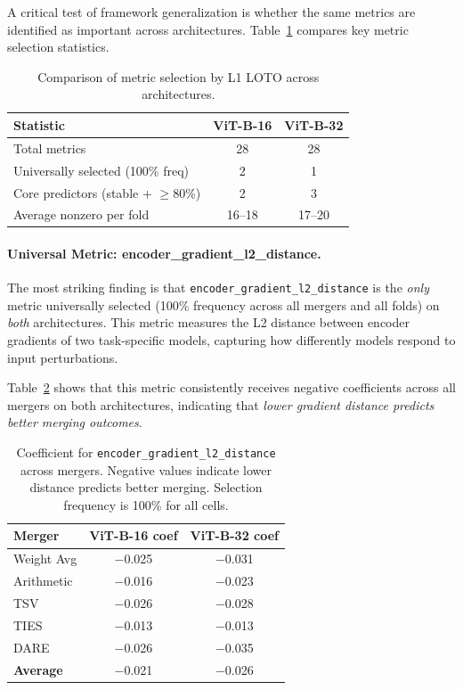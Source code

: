 A critical test of framework generalization is whether the same metrics are identified as important across architectures. Table~\ref{tab:metric_comparison} compares key metric selection statistics.

\begin{table}[h]
\centering
\caption{Comparison of metric selection by L1 LOTO across architectures.}
\label{tab:metric_comparison}
\begin{tabular}{l|cc}
\toprule
\textbf{Statistic} & \textbf{ViT-B-16} & \textbf{ViT-B-32} \\
\midrule
Total metrics & 28 & 28 \\
Universally selected (100\% freq) & 2 & 1 \\
Core predictors (stable + $\geq$80\%) & 2 & 3 \\
Average nonzero per fold & 16--18 & 17--20 \\
\bottomrule
\end{tabular}
\end{table}

\paragraph{Universal Metric: encoder\_gradient\_l2\_distance.}
The most striking finding is that \texttt{encoder\_gradient\_l2\_distance} is the \emph{only} metric universally selected (100\% frequency across all mergers and all folds) on \emph{both} architectures. This metric measures the L2 distance between encoder gradients of two task-specific models, capturing how differently models respond to input perturbations.

Table~\ref{tab:encoder_grad_coef} shows that this metric consistently receives negative coefficients across all mergers on both architectures, indicating that \emph{lower gradient distance predicts better merging outcomes}.

\begin{table}[h]
\centering
\caption{Coefficient for \texttt{encoder\_gradient\_l2\_distance} across mergers. Negative values indicate lower distance predicts better merging. Selection frequency is 100\% for all cells.}
\label{tab:encoder_grad_coef}
\begin{tabular}{l|cc}
\toprule
\textbf{Merger} & \textbf{ViT-B-16 coef} & \textbf{ViT-B-32 coef} \\
\midrule
Weight Avg & $-$0.025 & $-$0.031 \\
Arithmetic & $-$0.016 & $-$0.023 \\
TSV & $-$0.026 & $-$0.028 \\
TIES & $-$0.013 & $-$0.013 \\
DARE & $-$0.026 & $-$0.035 \\
\midrule
\textbf{Average} & $-$0.021 & $-$0.026 \\
\bottomrule
\end{tabular}
\end{table}

